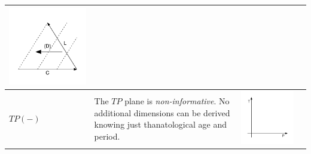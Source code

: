 \documentclass[
  12pt
]{scrartcl}
\begin{document}
\begin{center}
\begin{longtable}{m{}m{}m{}m{}}
  \includegraphics[width = \linewidth]{../fig/LCd_iso.pdf}  \\
  \midrule
  $TP(-)$ &
  The $TP$ plane is \emph{non-informative}. No additional dimensions can be derived knowing just thanatological age and period. &
  \includegraphics[width = \linewidth]{../fig/TP.pdf} &

\end{longtable}
\end{center}
\end{document}
